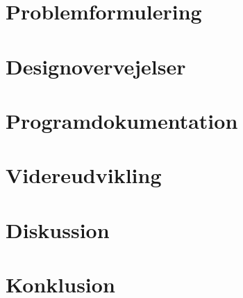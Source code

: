 \section{Problemformulering}
    

\newpage
\section{Designovervejelser}
    

\newpage
\section{Programdokumentation}
  

\newpage
\section{Videreudvikling}
  

\newpage
\section{Diskussion}

\newpage
\section{Konklusion}
  